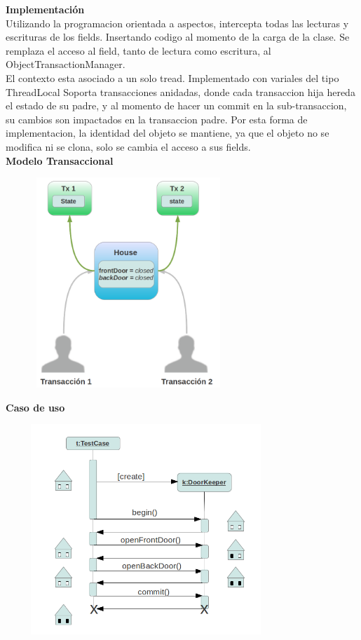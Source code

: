 \begin{enumerate}
	 
	{\bf Implementación}\\
	Utilizando la programacion orientada a aspectos, intercepta todas las lecturas
	y escrituras de los fields. Insertando codigo al momento de la carga de la
	clase.
	Se remplaza el acceso al field, tanto de lectura como escritura, al
	ObjectTransactionManager.\\
	
	El contexto esta asociado a un solo tread. Implementado con variales del tipo ThreadLocal
	Soporta transacciones anidadas, donde cada transaccion hija hereda el estado
	de su padre, y al momento de hacer un commit en la sub-transaccion, su cambios
	son impactados en la transaccion padre.
	Por esta forma de implementacion, la identidad del objeto se mantiene, ya que
	el objeto no se modifica ni se clona, solo se cambia el acceso a sus fields.\\
	
	{\bf Modelo Transaccional}
	
	\includegraphics[width=350px, height=300px]{img/transacionalModel}
	
	{\bf Caso de uso}
	
	\includegraphics[width=400px, height=300px]{img/tescasePOT}
	

\end{enumerate}
